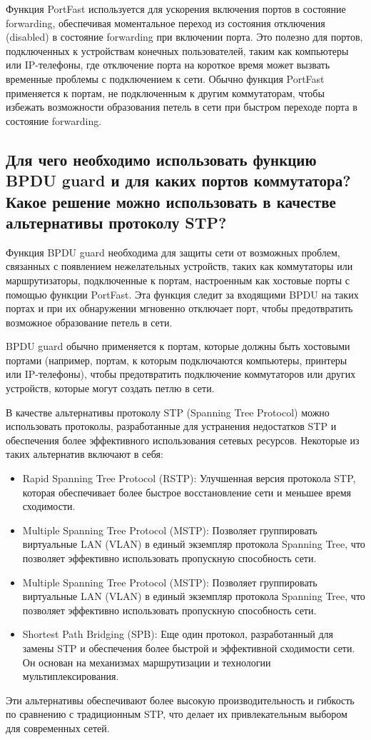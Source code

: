 Функция PortFast используется для ускорения включения портов в 
состояние forwarding, обеспечивая моментальное переход из состояния 
отключения (disabled) в состояние forwarding при включении порта. Это 
полезно для портов, подключенных к устройствам конечных 
пользователей, таким как компьютеры или IP-телефоны, где отключение 
порта на короткое время может вызвать временные проблемы с 
подключением к сети. Обычно функция PortFast применяется к портам, не 
подключенным к другим коммутаторам, чтобы избежать возможности 
образования петель в сети при быстром переходе порта в состояние 
forwarding.

\subsection{Для чего необходимо использовать функцию BPDU guard и для каких 
	портов коммутатора? Какое решение можно использовать в качестве 
	альтернативы протоколу STP?}

Функция BPDU guard необходима для защиты сети от возможных 
проблем, связанных с появлением нежелательных устройств, таких как 
коммутаторы или маршрутизаторы, подключенные к портам, 
настроенным как хостовые порты с помощью функции PortFast. Эта 
функция следит за входящими BPDU на таких портах и при их 
обнаружении мгновенно отключает порт, чтобы предотвратить возможное 
образование петель в сети.\par
BPDU guard обычно применяется к портам, которые должны быть 
хостовыми портами (например, портам, к которым подключаются 
компьютеры, принтеры или IP-телефоны), чтобы предотвратить 
подключение коммутаторов или других устройств, которые могут создать 
петлю в сети.\par
В качестве альтернативы протоколу STP (Spanning Tree Protocol) можно 
использовать протоколы, разработанные для устранения недостатков STP 
и обеспечения более эффективного использования сетевых ресурсов. 
Некоторые из таких альтернатив включают в себя:

\begin{itemize}
	\item Rapid Spanning Tree Protocol (RSTP): Улучшенная версия протокола 
		STP, которая обеспечивает более быстрое восстановление сети и 
		меньшее время сходимости.
	\item Multiple Spanning Tree Protocol (MSTP): Позволяет группировать 
		виртуальные LAN (VLAN) в единый экземпляр протокола Spanning 
		Tree, что позволяет эффективно использовать пропускную 
		способность сети.
	\item Multiple Spanning Tree Protocol (MSTP): Позволяет группировать 
		виртуальные LAN (VLAN) в единый экземпляр протокола Spanning 
		Tree, что позволяет эффективно использовать пропускную 
		способность сети. 
	\item Shortest Path Bridging (SPB): Еще один протокол, разработанный для 
		замены STP и обеспечения более быстрой и эффективной 
		сходимости сети. Он основан на механизмах маршрутизации и 
		технологии мультиплексирования.
\end{itemize}

Эти альтернативы обеспечивают более высокую производительность и 
гибкость по сравнению с традиционным STP, что делает их 
привлекательным выбором для современных сетей.

